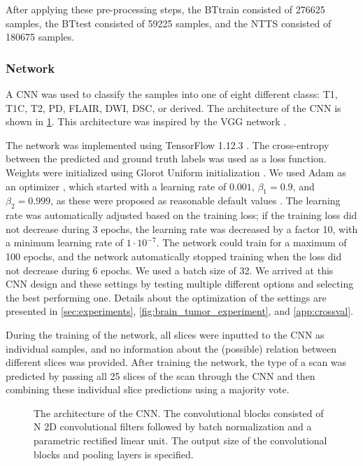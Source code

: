 After applying these pre-processing steps, the \gls{BTtrain} consisted of 276625 \glspl{sample}, the \gls{BTtest} consisted of 59225 \glspl{sample}, and the \gls{NTTS} consisted of 180675 \glspl{sample}.

\subsubsection{Network}
\label{sec:network}

A \gls{CNN} was used to classify the \glspl{sample} into one of eight different \glspl{class}: \gls{T1}, \gls{T1C}, \gls{T2}, \gls{PD}, \gls{FLAIR}, \gls{DWI}, \gls{DSC}, or derived.
The architecture of the \gls{CNN} is shown in \cref{fig:sequence_architecture}.
This architecture was inspired by the VGG network \autocite{simonyan2014very}.

The network was implemented using TensorFlow 1.12.3 \autocite{abadi2016tensorflow}.
The cross-entropy between the predicted and ground truth labels was used as a loss function.
Weights were initialized using Glorot Uniform initialization \autocite{glorot2010understanding}.
We used Adam as an optimizer \autocite{kingma2014adam}, which started with a learning rate of $0.001$, $\beta_1 = 0.9$, and $\beta_2=0.999$, as these were proposed as reasonable default values \autocite{kingma2014adam}.
The learning rate was automatically adjusted based on the training loss; if the training loss did not decrease during 3 epochs, the learning rate was decreased by a factor 10, with a minimum learning rate of $1\cdot10^{-7}$.
The network could train for a maximum of 100 epochs, and the network automatically stopped training when the loss did not decrease during 6 epochs.
We used a batch size of 32.
We arrived at this \gls{CNN} design and these settings by testing multiple different options and selecting the best performing one.
Details about the optimization of the settings are presented in \cref{sec:experiments}, \cref{fig:brain_tumor_experiment}, and \cref{app:crossval}.

During the training of the network, all \glspl{slice} were inputted to the \gls{CNN} as individual \glspl{sample}, and no information about the (possible) relation between different \glspl{slice} was provided.
After training the network, the \gls{type} of a \gls{scan} was predicted by passing all 25 \glspl{slice} of the \gls{scan} through the \gls{CNN} and then combining these individual \gls{slice} predictions using a majority vote.

\begin{figure}
\centering


\caption{The architecture of the \gls{CNN}. The convolutional blocks consisted of N 2D convolutional filters followed by batch normalization and a parametric rectified linear unit.
The output size of the convolutional blocks and pooling layers is specified.}
\label{fig:sequence_architecture}
\end{figure}

